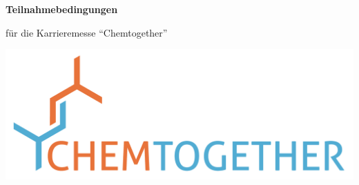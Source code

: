 \documentclass[8pt,a4paper]{article}
\renewcommand{\headrulewidth}{0.0pt}
\begin{document}
\emergencystretch=0pt


\renewcommand{\headrulewidth}{0pt}
\begin{minipage}[b]{0.5\textwidth}
	\LARGE{\textbf{Teilnahmebedingungen}}\par
	\large{für die Karrieremesse ``Chemtogether''}
\end{minipage}\hfill
\begin{minipage}[b]{0.4\textwidth}
	\includegraphics[width=\linewidth]{logo.png}
\end{minipage}

\vspace{2cm}
\end{document}
